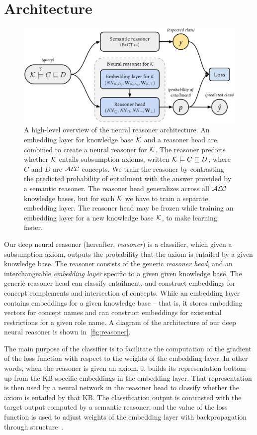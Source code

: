 \section{Architecture}

\begin{figure}
\centering
\includegraphics[width=\linewidth]{figures/reasoner.png}
\caption{
A high-level overview of the neural reasoner architecture.
An embedding layer for knowledge base $\mathcal{K}$ and a reasoner head are combined to create a neural reasoner for $\mathcal{K}$.
The reasoner predicts whether $\mathcal{K}$ entails subsumption axioms, written $\mathcal{K} \models C \sqsubseteq D$, where $C$ and $D$ are $\mathcal{ALC}$ concepts.
We train the reasoner by contrasting the predicted probability of entailment with the answer provided by a semantic reasoner.
The reasoner head generalizes across all $\mathcal{ALC}$ knowledge bases, but for each $\mathcal{K}$ we have to train a separate embedding layer.
The reasoner head may be frozen while training an embedding layer for a new knowledge base $\mathcal{K}$, to make learning faster.
}
\label{fig:reasoner}
\end{figure}

Our deep neural reasoner (hereafter, \emph{reasoner}) is a classifier, which given a subsumption axiom, outputs the probability that the axiom is entailed by a given knowledge base.
The reasoner consists of the generic \emph{reasoner head}, and an interchangeable \emph{embedding layer} specific to a given given knowledge base.
The generic reasoner head can classify entailment, and construct embeddings for concept complements and intersection of concepts.
While an embedding layer contains embeddings for a given knowledge base -- that is, it stores embedding vectors for concept names and can construct embeddings for existential restrictions for a given role name.
A diagram of the architecture of our deep neural reasoner is shown in~\autoref{fig:reasoner}.

The main purpose of the classifier is to facilitate the computation of the gradient of the loss function with respect to the weights of the embedding layer.
In other words, when the reasoner is given an axiom, it builds its representation bottom-up from the KB-specific embeddings in the embedding layer.
That representation is then used by a neural network in the reasoner head to classify whether the axiom is entailed by that KB.
The classification output is contrasted with the target output computed by a semantic reasoner, and the value of the loss function is used to adjust weights of the embedding layer with backpropagation through structure~\cite{goller_learning_1996}.

